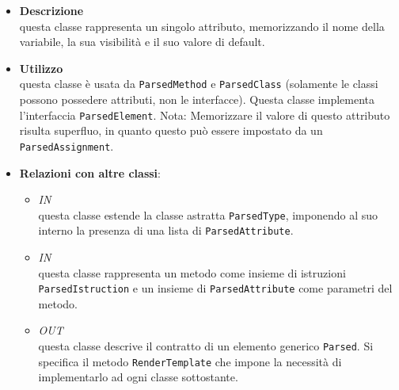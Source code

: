 \label{\nogloxy{swedesigner::server::project::ParsedAttribute}}
\begin{itemize}
\item \textbf{Descrizione}\\
questa classe rappresenta un singolo attributo, memorizzando il nome della variabile, la sua visibilità e il suo valore di default. 
\item \textbf{Utilizzo}\\
questa classe è usata da \texttt{ParsedMethod} e \texttt{ParsedClass} (solamente le classi possono possedere attributi, non le interfacce).
Questa classe implementa l'interfaccia \texttt{ParsedElement}.
Nota: Memorizzare il valore di questo attributo risulta superfluo, in quanto questo può essere impostato da un \texttt{ParsedAssignment}. 

\item \textbf{Relazioni con altre classi}:
\begin{itemize}
\item \textit{IN} \hyperref[\nogloxy{swedesigner::server::project::ParsedClass}]{}\\
questa classe estende la classe astratta \texttt{ParsedType}, imponendo al suo interno la presenza di una lista di \texttt{ParsedAttribute}. 
\item \textit{IN} \hyperref[\nogloxy{swedesigner::server::project::ParsedMethod}]{}\\
questa classe rappresenta un metodo come insieme di istruzioni \texttt{ParsedIstruction} e un insieme di \texttt{ParsedAttribute} come parametri del metodo.
\item \textit{OUT} \hyperref[\nogloxy{swedesigner::server::project::ParsedElement}]{}\\
questa classe descrive il contratto di un elemento generico \texttt{Parsed}. Si specifica il metodo \texttt{RenderTemplate} che impone la necessità di implementarlo ad ogni classe sottostante.
\end{itemize}
\end{itemize}


